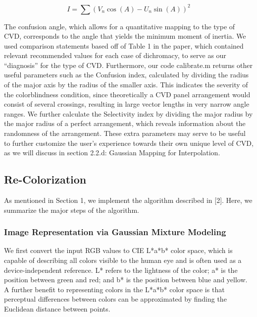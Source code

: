 \documentclass[10pt,twocolumn,letterpaper]{article}
\begin{document}
\begin{equation}\label{inertia2}
  I = \sum (V_n\cos(A) - U_n\sin(A))^{2}
\end{equation}

The confusion angle, which allows for a quantitative mapping to the type of CVD, corresponds to the angle that yields the minimum moment of inertia. We used comparison statements based off of Table 1 in the paper, which contained relevant recommended values for each case of dichromacy, to serve as our “diagnosis” for the type of CVD. Furthermore, our code calibrate.m returns other useful parameters such as the Confusion index, calculated by dividing the radius of the major axis by the radius of the smaller axis. This indicates the severity of the colorblindness condition, since theoretically a CVD panel arrangement would consist of several crossings, resulting in large vector lengths in very narrow angle ranges. We further calculate the Selectivity index by dividing the major radius by the major radius of a perfect arrangement, which reveals information about the randomness of the arrangement. These extra parameters may serve to be useful to further customize the user’s experience towards their own unique level of CVD, as we will discuss in section 2.2.d: Gaussian Mapping for Interpolation. 

\subsection{Re-Colorization}

As mentioned in Section 1, we implement the algorithm described in [2]. Here, we summarize the major steps of the algorithm. 

\subsubsection{Image Representation via Gaussian Mixture Modeling}

We first convert the input RGB values to CIE L*a*b* color space, which is capable of describing all colors visible to the human eye and is often used as a device-independent reference. L* refers to the lightness of the color; a* is the position between green and red; and b* is the position between blue and yellow. A further benefit to representing colors in the L*a*b* color space is that perceptual differences between colors can be approximated by finding the Euclidean distance between points. 
\end{document}
